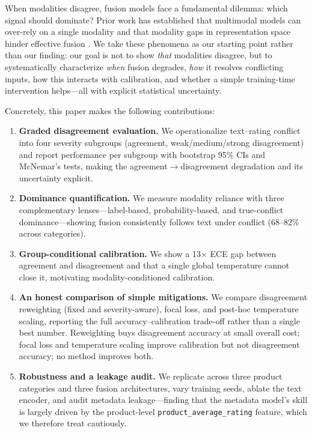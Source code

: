 \documentclass[11pt,a4paper]{article}
\begin{document}
When modalities disagree, fusion models face a fundamental dilemma: which signal should dominate?
Prior work has established that multimodal models can over-rely on a single modality \citep{wang2020makes, peng2022balanced} and that modality gaps in representation space hinder effective fusion \citep{liang2022mind}.
We take these phenomena as our starting point rather than our finding: our goal is not to show \emph{that} modalities disagree, but to systematically characterize \emph{when} fusion degrades, \emph{how} it resolves conflicting inputs, how this interacts with calibration, and whether a simple training-time intervention helps---all with explicit statistical uncertainty.

Concretely, this paper makes the following contributions:
\begin{enumerate}[leftmargin=*,nosep]
  \item \textbf{Graded disagreement evaluation.} We operationalize text--rating conflict into four severity subgroups (agreement, weak/medium/strong disagreement) and report performance per subgroup with bootstrap 95\% CIs and McNemar's tests, making the agreement$\to$disagreement degradation and its uncertainty explicit.
  \item \textbf{Dominance quantification.} We measure modality reliance with three complementary lenses---label-based, probability-based, and true-conflict dominance---showing fusion consistently follows text under conflict (68--82\% across categories).
  \item \textbf{Group-conditional calibration.} We show a 13$\times$ ECE gap between agreement and disagreement and that a single global temperature cannot close it, motivating modality-conditioned calibration.
  \item \textbf{An honest comparison of simple mitigations.} We compare disagreement reweighting (fixed and severity-aware), focal loss, and post-hoc temperature scaling, reporting the full accuracy--calibration trade-off rather than a single best number. Reweighting buys disagreement accuracy at small overall cost; focal loss and temperature scaling improve calibration but not disagreement accuracy; no method improves both.
  \item \textbf{Robustness and a leakage audit.} We replicate across three product categories and three fusion architectures, vary training seeds, ablate the text encoder, and audit metadata leakage---finding that the metadata model's skill is largely driven by the product-level \texttt{product\_average\_rating} feature, which we therefore treat cautiously.
\end{enumerate}
\end{document}
